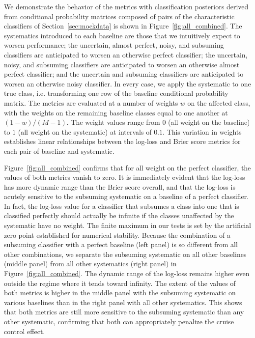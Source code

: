 We demonstrate the behavior of the metrics with classification posteriors derived from conditional probability matrices composed of pairs of the characteristic classifiers of Section~\ref{sec:mockdata} is shown in Figure~\ref{fig:all_combined}.
The systematics introduced to each baseline are those that we intuitively expect to worsen performance;
the uncertain, almost perfect, noisy, and subsuming classifiers are anticipated to worsen an otherwise perfect classifier;
the uncertain, noisy, and subsuming classifiers are anticipated to worsen an otherwise almost perfect classifier;
and the uncertain and subsuming classifiers are anticipated to worsen an otherwise noisy classifier.
In every case, we apply the systematic to one true class, i.e. transforming one row of the baseline conditional probability matrix.
The metrics are evaluated at a number of weights $w$ on the affected class, with the weights on the remaining baseline classes equal to one another at $(1 - w) / (M - 1)$.
The weight values range from $0$ (all weight on the baseline) to $1$ (all weight on the systematic) at intervals of $0.1$.
This variation in weights establishes linear relationships between the log-loss and Brier score metrics for each pair of baseline and systematic.

Figure~\ref{fig:all_combined} confirms that for all weight on the perfect classifier, the values of both metrics vanish to zero.
It is immediately evident that the log-loss has more dynamic range than the Brier score overall, and that the log-loss is acutely sensitive to the subsuming systematic on a baseline of a perfect classifier.
In fact, the log-loss value for a classifier that subsumes a class into one that is classified perfectly should actually be infinite if the classes unaffected by the systematic have no weight.
The finite maximum in our tests is set by the artificial zero point established for numerical stability.
Because the combination of a subsuming classifier with a perfect baseline (left panel) is so different from all other combinations, we separate the subsuming systematic on all other baselines (middle panel) from all other systematics (right panel) in Figure~\ref{fig:all_combined}.
The dynamic range of the log-loss remains higher even outside the regime where it tends toward infinity.
The extent of the values of both metrics is higher in the middle panel with the subsuming systematic on various baselines than in the right panel with all other systematics.
This shows that both metrics are still more sensitive to the subsuming systematic than any other systematic, confirming that both can appropriately penalize the cruise control effect.

